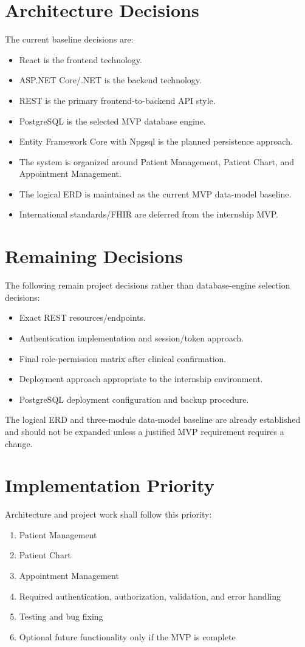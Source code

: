 \documentclass[11pt,a4paper]{article}
\begin{document}
\section{Architecture Decisions}
The current baseline decisions are:
\begin{itemize}
    \item React is the frontend technology.
    \item ASP.NET Core/.NET is the backend technology.
    \item REST is the primary frontend-to-backend API style.
    \item PostgreSQL is the selected MVP database engine.
    \item Entity Framework Core with Npgsql is the planned persistence approach.
    \item The system is organized around Patient Management, Patient Chart, and Appointment Management.
    \item The logical ERD is maintained as the current MVP data-model baseline.
    \item International standards/FHIR are deferred from the internship MVP.
\end{itemize}

\section{Remaining Decisions}
The following remain project decisions rather than database-engine selection decisions:
\begin{itemize}
    \item Exact REST resources/endpoints.
    \item Authentication implementation and session/token approach.
    \item Final role-permission matrix after clinical confirmation.
    \item Deployment approach appropriate to the internship environment.
    \item PostgreSQL deployment configuration and backup procedure.
\end{itemize}

The logical ERD and three-module data-model baseline are already established and should not be expanded unless a justified MVP requirement requires a change.

\section{Implementation Priority}
Architecture and project work shall follow this priority:
\begin{enumerate}
    \item Patient Management
    \item Patient Chart
    \item Appointment Management
    \item Required authentication, authorization, validation, and error handling
    \item Testing and bug fixing
    \item Optional future functionality only if the MVP is complete
\end{enumerate}
\end{document}
